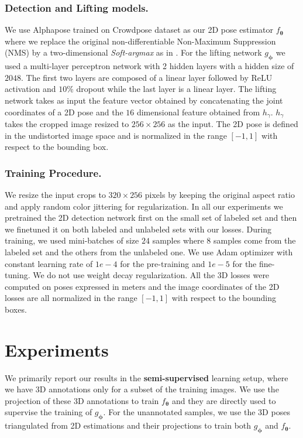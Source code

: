 \documentclass[runningheads]{llncs}
\def\Mat#1{{\boldsymbol{#1}}}
\begin{document}
\subsubsection*{Detection and Lifting models.}
We use Alphapose \cite{Fang17a} trained on Crowdpose dataset \cite{Li18l} as our 2D pose estimator $f_{\Mat{\theta}}$ where we replace the original non-differentiable Non-Maximum Suppression (NMS) by a two-dimensional {\it Soft-argmax} as in \cite{Sun18d}. For the lifting network $g_{\Mat{\phi}}$ we used a multi-layer perceptron network with 2 hidden layers with a hidden size of $2048$. The first two layers are composed of a linear layer followed by ReLU activation and $10 \%$ dropout while the last layer is a linear layer. The lifting network takes as input the feature vector obtained by concatenating the joint coordinates of a 2D pose and the $16$ dimensional feature obtained from $h_{\gamma}$. $h_{\gamma}$ takes the cropped image resized to $256\times256$ as the input. The 2D pose is defined in the undistorted image space and is normalized in the range $[-1,1]$ with respect to the bounding box.


\subsubsection*{Training Procedure.}
We resize the input crops to $320 \times 256$ pixels by keeping the original aspect ratio and apply random color jittering for regularization.
In all our experiments we pretrained the 2D detection network first on the small set of labeled set and then we finetuned it on both labeled and unlabeled sets with our losses. During training, we used mini-batches of size $24$ samples where $8$ samples come from the labeled set and the others from the unlabeled one. We use Adam optimizer \cite{Kingma15} with constant learning rate of $1e-4$ for the pre-training and $1e-5$ for the fine-tuning. We do not use weight decay regularization. All the 3D losses were computed on poses expressed in meters and the image coordinates of the 2D losses are all normalized in the range $[-1,1]$ with respect to the bounding boxes. \section{Experiments}
\label{sec:exp}

We primarily report our results in the \textbf{semi-supervised} learning setup, where we have 3D annotations only for a subset of the training images. We use the projection of these 3D annotations to train $f_{\Mat{\theta}}$ and they are directly used to supervise the training of $g_{\Mat{\phi}}$. For the unannotated samples, we use the 3D poses triangulated from 2D estimations and their projections to train both $g_{\Mat{\phi}}$ and $f_{\Mat{\theta}}$.
\end{document}
